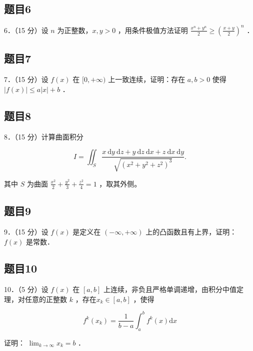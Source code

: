 \documentclass{article}
\begin{document}
\subsection{题目6}
6．（15 分）设 \(n\) 为正整数，\(x, y>0\) ，用条件极值方法证明 \(\frac{x^{n}+y^{n}}{2} \geq\left(\frac{x+y}{2}\right)^{n}\) ．

\subsection{题目7}
7．（15 分）设 \(f(x)\) 在 \([0,+\infty)\) 上一致连续，证明：存在 \(a, b>0\) 使得 \(|f(x)| \leq a|x|+b\) ．

\subsection{题目8}
8．（15 分）计算曲面积分

\[
I=\iint_{S} \frac{x \mathrm{~d} y \mathrm{~d} z+y \mathrm{~d} z \mathrm{~d} x+z \mathrm{~d} x \mathrm{~d} y}{\sqrt{\left(x^{2}+y^{2}+z^{2}\right)^{3}}} .
\]

其中 \(S\) 为曲面 \(\frac{x^{2}}{2}+\frac{y^{2}}{3}+\frac{z^{2}}{4}=1\) ，取其外侧。

\subsection{题目9}
9．（15 分）设 \(f(x)\) 是定义在 \((-\infty,+\infty)\) 上的凸函数且有上界，证明：\(f(x)\) 是常数．

\subsection{题目10}
10．（5 分）设 \(f(x)\) 在 \([a, b]\) 上连续，非负且严格单调递增，由积分中值定理，对任意的正整数 \(k\) ，存在\(x_{k} \in[a, b]\) ，使得

\[
f^{k}\left(x_{k}\right)=\frac{1}{b-a} \int_{a}^{b} f^{k}(x) \mathrm{d} x
\]

证明： \(\lim _{k \rightarrow \infty} x_{k}=b\) ．
\end{document}
